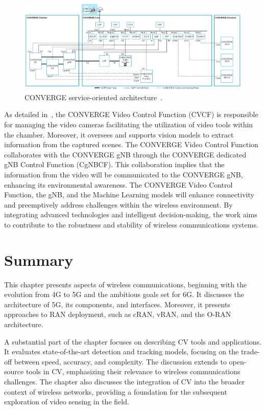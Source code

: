 \begin{figure}[H]
    \centering
    \includegraphics[width=1\linewidth]{figures/arch_converge}
    \caption[CONVERGE service-oriented architecture] {CONVERGE service-oriented architecture~\cite{converge2023_specs}.}
    \label{fig:converge_arch}
\end{figure}

As detailed in~\cite{converge2023_specs}, the CONVERGE Video Control Function (CVCF) is responsible for managing the video cameras facilitating the utilization
of video tools within the chamber.
Moreover, it oversees and supports
vision models to extract information from the captured scenes.
The CONVERGE Video Control Function collaborates with the CONVERGE gNB through the CONVERGE dedicated gNB Control Function (CgNBCF).
This collaboration implies that the information from the video will be communicated to the CONVERGE gNB, enhancing its environmental awareness.
The CONVERGE Video Control Function, the gNB, and the Machine Learning models will
enhance connectivity and preemptively address challenges within the wireless environment.
By integrating advanced technologies and intelligent decision-making, the work
aims to contribute to the robustness and stability of wireless communications systems.


\section{Summary}\label{sec:Summary_SOA}
This chapter presents aspects of wireless communications, beginning with the evolution from 4G to 5G and the ambitious goals set for 6G\@.
It discusses the architecture of 5G, its components, and interfaces.
Moreover, it presents approaches to RAN deployment, such as cRAN, vRAN, and the O-RAN architecture.

A substantial part of the chapter focuses on describing CV tools and applications.
It evaluates state-of-the-art detection and tracking models, focusing on the trade-off between speed, accuracy, and complexity.
The discussion extends to open-source tools in CV, emphasizing their relevance to wireless communications challenges.
The chapter also discusses the integration of CV into the broader context of wireless networks, providing a foundation for the subsequent exploration of video sensing in the field.

